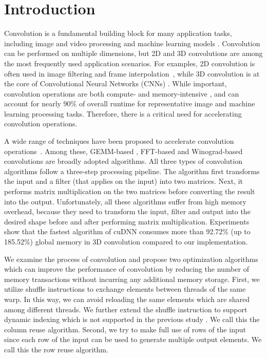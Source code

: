 \section{Introduction}
Convolution is a fundamental building block for many application tasks, including image and video processing and machine learning
models \cite{Perrot2014Fine,Ma2014Optimized,Rudi2015Image,Niklaus2017Video,Krizhevsky2012ImageNet,SimonyanZ14a,HeZRS16,SzegedyLJSRAEVR15}. Convolution can be performed on multiple dimensions, but 2D and 3D convolutions are among the most frequently used
application scenarios. For examples, 2D convolution is often used in image filtering and frame
interpolation~\cite{Perrot2014Fine,Ma2014Optimized,Rudi2015Image,Niklaus2017Video}, while 3D convolution is at the core of Convolutional
Neural Networks (CNNs) \cite{Krizhevsky2012ImageNet,SimonyanZ14a,HeZRS16,SzegedyLJSRAEVR15}. While important, convolution operations are both compute- and memory-intensive \cite{cavigelli2015accelerating},
and can account for nearly 90\% of overall runtime \cite{Li2016Performance} for representative image and machine learning processing tasks.
Therefore, there is a critical need for accelerating convolution operations.


A wide range of techniques have been proposed to accelerate convolution
operations~\cite{Iandola2014Communication,vasilache2014fast,lavin2016fast,cho2017mec,Zhen2018Optimizing,Vasudevan2017Parallel,Chellapilla2006High}.
 Among these, GEMM-based
\cite{Vasudevan2017Parallel} \cite{Chellapilla2006High}, FFT-based \cite{vasilache2014fast} and Winograd-based convolutions
\cite{lavin2016fast} are broadly adopted algorithms. All three types of convolution algorithms follow a three-step processing pipeline. The
algorithm first transforms the input and a filter (that applies on the input) into two matrices. Next, it performs matrix multiplication on
the two matrices before converting the result into the output. Unfortunately, all these algorithms suffer from high memory overhead,
because they need to transform the input, filter and output into the desired shape before and after performing matrix multiplication.
{\color{red}Experiments show that the fastest algorithm of cuDNN consumes more than 92.72\% (up to 185.52\%) global memory in 3D convolution compared to our implementation.}

We examine the process of convolution and propose two optimization algorithms which can improve the performance of convolution by reducing
the number of memory transactions without incurring any additional memory storage. First, we utilize shuffle instructions to exchange elements between threads of the same warp. In this way, we can
avoid reloading the same elements which are shared among different threads. We further extend the shuffle instruction to support dynamic
indexing which is not supported in the previous study \cite{vasilache2014fast}. We call this the column reuse algorithm. Second, we try to
make full use of rows of the input since each row of the input can be used to generate multiple output elements. We call this the row reuse
algorithm.

